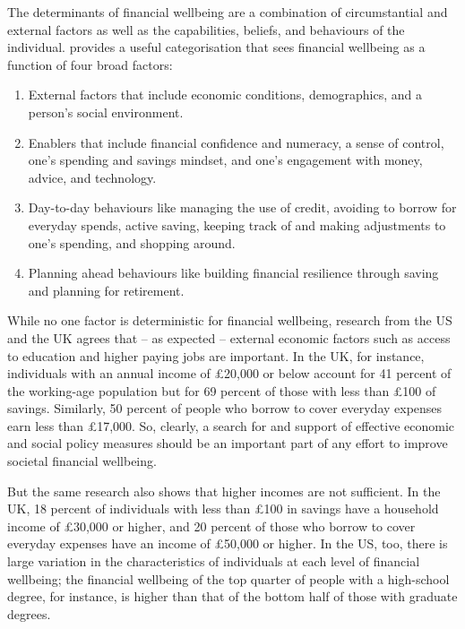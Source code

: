 The determinants of financial wellbeing are a combination of circumstantial and
external factors as well as the capabilities, beliefs, and behaviours of the
individual. \citet{mps2018building} provides a useful categorisation that sees
financial wellbeing as a function of four broad factors:

{\color{blue}
\begin{enumerate}
    \item External factors that
    include economic conditions, demographics, and a person's social environment.
    
    \item Enablers that include financial confidence and numeracy, a sense of control,
    one's spending and savings mindset, and one's engagement with money, advice, and
    technology.
    
    \item Day-to-day behaviours like managing the use of credit, avoiding to
    borrow for everyday spends, active saving, keeping track of and making
    adjustments to one's spending, and shopping around.
    
    \item Planning ahead
    behaviours like building financial resilience through saving and planning for
    retirement.
\end{enumerate}
}

While no one factor is deterministic for financial wellbeing, research from the
US \citep{cfpb2017financial} and the UK \citep{mps2018building} agrees that -- as
expected -- external economic factors such as access to education and higher
paying jobs are important. In the UK, for instance, individuals with an annual
income of \pounds20,000 or below account for 41 percent of the working-age
population but for 69 percent of those with less than \pounds100 of savings.
Similarly, 50 percent of people who borrow to cover everyday expenses earn less
than \pounds17,000. So, clearly, a search for and support of effective economic
and social policy measures should be an important part of any effort to improve
societal financial wellbeing.

But the same research also shows that higher
incomes are not sufficient. In the UK, 18 percent of individuals with less than
\pounds 100 in savings have a household income of \pounds30,000 or higher, and
20 percent of those who borrow to cover everyday expenses have an income of
\pounds50,000 or higher. In the US, too, there is large variation in the
characteristics of individuals at each level of financial wellbeing; the
financial wellbeing of the top quarter of people with a high-school degree, for
instance, is higher than that of the bottom half of those with graduate
degrees.

